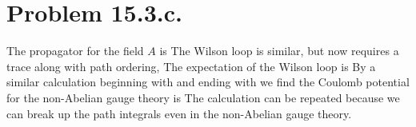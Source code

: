 \documentclass{article}
\begin{document}
\section*{Problem 15.3.c.}
The propagator for the field $A$ is
The Wilson loop is similar, but now requires a trace along with path ordering,
The expectation of the Wilson loop is
By a similar calculation beginning with  and ending with  we find the Coulomb potential for the non-Abelian gauge theory is
The calculation can be repeated because we can break up the path integrals even in the non-Abelian gauge theory.
\end{document}
